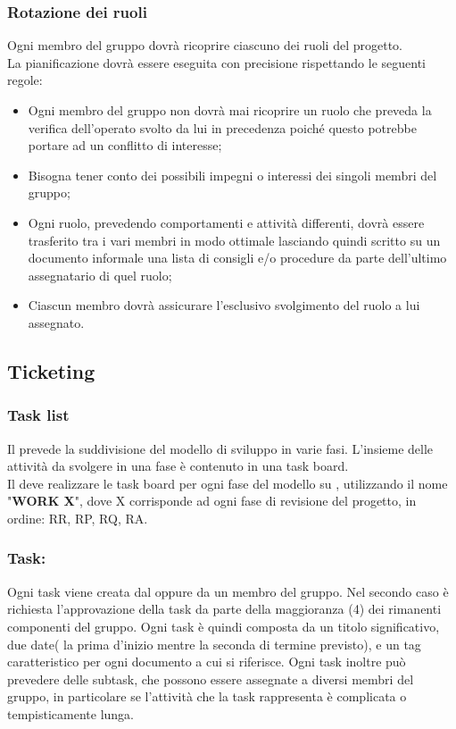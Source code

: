 \documentclass[NormeDiProgetto.tex]{subfiles}
\begin{document}
	\subsubsection{Rotazione dei ruoli}
	Ogni membro del gruppo dovrà ricoprire ciascuno dei ruoli del progetto.\\
	La pianificazione dovrà essere eseguita con precisione rispettando le seguenti regole:
	\begin{itemize}
		\item Ogni membro del gruppo non dovrà mai ricoprire un ruolo che preveda la verifica dell'operato svolto da lui in precedenza poiché questo potrebbe	portare ad un conflitto di interesse;
		\item Bisogna tener conto dei possibili impegni o interessi dei singoli membri del gruppo;
		\item Ogni ruolo, prevedendo comportamenti e attività differenti, dovrà essere trasferito tra i vari membri in modo ottimale lasciando quindi scritto su un documento informale una lista di consigli e/o procedure da parte dell'ultimo assegnatario di quel ruolo;
		\item Ciascun membro dovrà assicurare l'esclusivo svolgimento del ruolo a lui assegnato.
	\end{itemize}
	
	
	\subsection{Ticketing}
	\subsubsection{Task list}
	Il \pdp{} prevede la suddivisione del modello di sviluppo in varie fasi.
	L'insieme delle attività da svolgere in una fase è contenuto in una task board.\\
	Il \respdiprog{} deve realizzare le task board per ogni fase del modello su , utilizzando il nome "\textbf{WORK X}", dove X corrisponde ad ogni fase di revisione del progetto, in ordine: RR, RP, RQ, RA.
	
	\subsubsection{Task:}
	Ogni task viene creata dal \respdiprog{} oppure da un membro del gruppo. Nel secondo caso è richiesta l'approvazione della task da parte della maggioranza (4) dei rimanenti componenti del gruppo.
	Ogni task è quindi composta da un titolo significativo, due date( la prima d'inizio mentre la seconda di termine previsto), e un tag caratteristico per ogni documento a cui si riferisce. Ogni task inoltre può prevedere delle subtask, che possono essere assegnate a diversi membri del gruppo, in particolare se l'attività che la task rappresenta è complicata o tempisticamente lunga.
	
\end{document}
